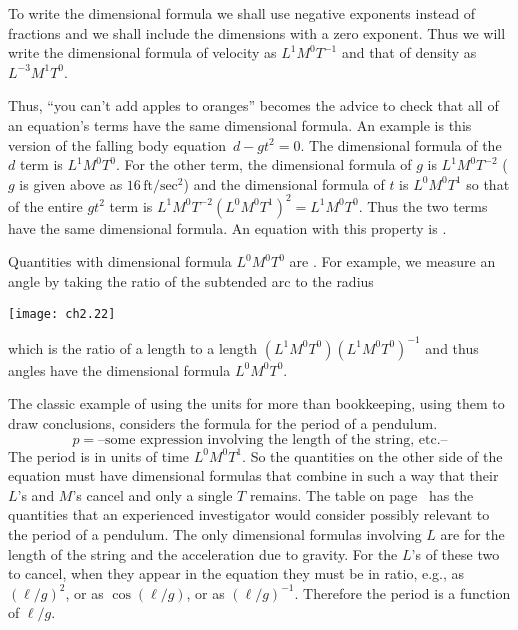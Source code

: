 To write the dimensional formula 
we shall use negative exponents instead of  
fractions and we shall include the dimensions with a
zero exponent.
Thus we will write the dimensional formula of
velocity as $L^1M^0T^{-1}$ and that of density
as $L^{-3}M^1T^0$.

Thus, ``you can't add apples to oranges'' becomes
the advice to check that all of an equation's terms have 
the same dimensional formula.
An example is this version of the falling body equation~$d-gt^2=0$. 
The dimensional formula of the $d$ term is $L^1M^0T^0$. 
For the other term, the dimensional formula of $g$ is $L^1M^0T^{-2}$ 
($g$ is given above as $16\,\text{ft}/\text{sec}^2$) 
and the dimensional formula of $t$ is $L^0M^0T^1$ so that of  
the entire $gt^2$ term is
$L^1M^0T^{-2}(L^0M^0T^1)^2=L^1M^0T^0$. 
Thus the two terms have the same dimensional formula.
An equation with this property is .

Quantities with dimensional formula $L^0M^0T^0$ are .
For example, we measure an angle by taking
the ratio of the subtended arc to the radius
\begin{center}
  \texttt{[image: ch2.22]}
\end{center}
which is the ratio of a length to a length $(L^1M^0T^0)(L^1M^0T^0)^{-1}$ and
thus angles have the dimensional formula $L^0M^0T^0$.

The classic example of using the units for more than bookkeeping, using them 
to draw conclusions, considers the formula for the period of a pendulum.
\begin{equation*}
  p=\text{--some expression involving the length of the string, etc.--}
\end{equation*}
The period is in units of time $L^0M^0T^1$.
So the quantities on the 
other side of the equation must have dimensional formulas that combine 
in such a way that their $L$'s and $M$'s cancel and only a 
single $T$ remains.
The table on page~\pageref{table:Dimen} has the quantities that
an experienced investigator would consider possibly relevant to the period of
a pendulum. 
The only dimensional formulas involving $L$ are for
the length of the string and the acceleration due to gravity.
For the $L$'s of these two to cancel, when they appear 
in the equation they must be in ratio,
e.g., as $(\ell/g)^2$, or as $\cos(\ell/g)$, 
or as $(\ell/g)^{-1}$.
Therefore the period is a function of $\ell/g$. 

